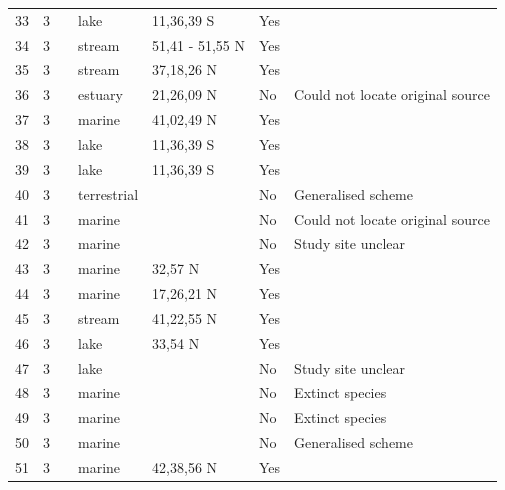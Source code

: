 \documentclass[12pt]{article}
\begin{document}
\begin{landscape}
\begin{table}[h!]
{\begin{tabular}{p{2.8cm}p{1.3cm}p{3cm}p{2.2cm}p{2.5cm}lp{8.2cm}}
        33    & 3 & \cite{Fryer1959} & lake & 11,36,39 S & Yes   &       \\
        34    & 3 & \cite{Jones1949}     & stream & 51,41 - 51,55 N & Yes   &       \\
        35    & 3 & \cite{Minshall1967}    & stream & 37,18,26 N & Yes   &       \\
        36    & 3 & \cite{Walsh1967}  & estuary & 21,26,09 N & No    & Could not locate original source \\
        37    & 3 & \cite{Clarke1967}    & marine & 41,02,49 N & Yes   &       \\
        38    & 3 & \cite{Fryer1959} & lake & 11,36,39 S & Yes   &       \\
        39    & 3 & \cite{Fryer1959} & lake & 11,36,39 S & Yes   &       \\
        40    & 3 & \cite{Harrison1962}  & terrestrial &       & No    & Generalised scheme \\
        41    & 3 & \cite{Parin1970}  & marine &       & No    & Could not locate original source \\
        42    & 3 & \cite{Vinogradov1978}  & marine &       & No    & Study site unclear \\
        43    & 3 & \cite{Rosenthal1974}    & marine & 32,57 N & Yes   &       \\
        44    & 3 & \cite{Yanez1978}  & marine & 17,26,21 N & Yes   &       \\
        45    & 3 & \cite{Tilly1968}    & stream & 41,22,55 N & Yes   &       \\
        46    & 3 & \cite{Patten1975}    & lake & 33,54 N & Yes   &       \\
        47    & 3 & \cite{Harris1980}    & lake &       & No    & Study site unclear \\
        48    & 3 & \cite{Simenstad1978}    & marine &       & No    & Extinct species \\
        49    & 3 & \cite{Simenstad1978}    & marine &       & No    & Extinct species \\
        50    & 3 & \cite{Nybakken1982}    & marine &       & No    & Generalised scheme \\
        51    & 3 & \cite{Dexter1947}    & marine & 42,38,56 N & Yes   &       \\
      \hline
      \end{tabular}}%
      \end{table}

        \newpage


\end{landscape}
\end{document}
